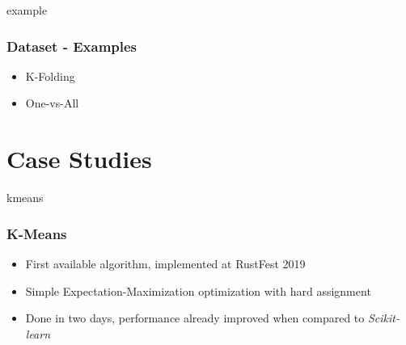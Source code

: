 \documentclass[xcolor=x11names,compress]{beamer}
\begin{document}
\begin{frame}{example}
    \frametitle{Dataset - Examples}

    \begin{itemize}
        \item<1-> K-Folding
        \item<2-> One-vs-All
    \end{itemize}
\end{frame}

\section{Case Studies}

\begin{frame}{kmeans}
    \frametitle{K-Means}

    \begin{itemize}
        \item<1-> First available algorithm, implemented at RustFest 2019
        \item<2-> Simple Expectation-Maximization optimization with hard assignment
        \item<3-> Done in two days, performance already improved when compared to \textit{Scikit-learn}
            \vspace{1em} 
    \end{itemize}
\end{frame}
\end{document}

